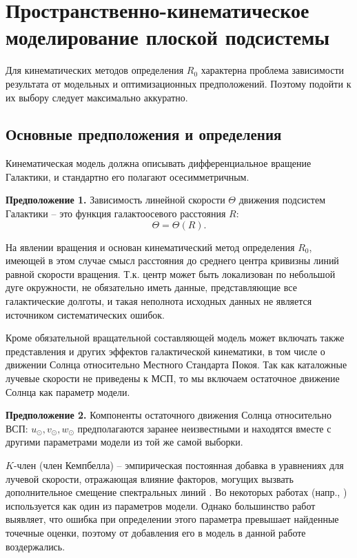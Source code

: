 \documentclass{matmex-diploma-custom}
\begin{document}
\par 
\section{Пространственно-кинематическое моделирование плоской подсистемы}

Для кинематических методов определения $R_0$ характерна проблема зависимости результата от модельных и оптимизационных предположений. Поэтому подойти к их выбору следует максимально аккуратно.
\subsection{Основные предположения и определения}
Кинематическая модель должна описывать дифференциальное вращение Галактики, и стандартно его полагают осесимметричным.

\textbf{Предположение 1.}
Зависимость линейной скорости $\Theta$ движения подсистем Галактики -- это функция галактоосевого расстояния $R$: 
\begin{equation}
        \Theta = \Theta(R).
\end{equation}

На явлении вращения и основан кинематический метод определения $R_0$, имеющей в этом случае смысл расстояния до среднего центра кривизны линий равной скорости вращения. Т.к. центр может быть локализован по небольшой дуге окружности, не обязательно иметь данные, представляющие все галактические долготы, и такая неполнота исходных данных не является источником систематических ошибок.
\par Кроме обязательной вращательной составляющей модель может включать также представления и других эффектов галактической кинематики, в том числе о движении Солнца относительно Местного Стандарта Покоя. Так как каталожные лучевые скорости не приведены к МСП, то мы включаем остаточное движение Солнца как параметр модели. 

\textbf{Предположение 2.}
Компоненты остаточного движения Солнца относительно ВСП: $u_{\odot}, v_{\odot}, w_{\odot}$ предполагаются заранее неизвестными и находятся вместе с другими параметрами модели из той же самой выборки.

\par $K$-член (член Кемпбелла) -- эмпирическая постоянная добавка в уравнениях для лучевой скорости, отражающая влияние факторов, могущих вызвать дополнительное смещение спектральных линий \cite{Kulik}. Во некоторых работах (напр., \cite{Loktin} \cite{Balona}) используется как один из параметров модели. Однако большинство работ выявляет, что ошибка при определении этого параметра превышает найденные точечные оценки, поэтому от добавления его в модель в данной работе воздержались.
\end{document}
